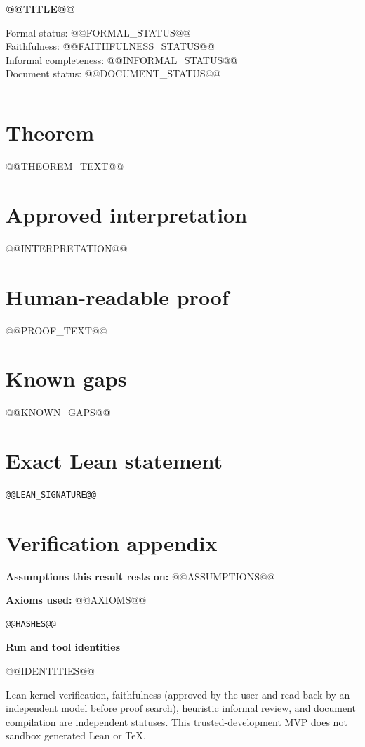 \documentclass[11pt]{article}
\begin{document}
\begin{center}
{\LARGE\color{HardyBlue}\bfseries @@TITLE@@\par}
\vspace{1em}
Formal status: @@FORMAL_STATUS@@\\
Faithfulness: @@FAITHFULNESS_STATUS@@\\
Informal completeness: @@INFORMAL_STATUS@@\\
Document status: @@DOCUMENT_STATUS@@
\end{center}

\hrule
\vspace{1em}

\section*{Theorem}
@@THEOREM_TEXT@@

\section*{Approved interpretation}
@@INTERPRETATION@@

\section*{Human-readable proof}
@@PROOF_TEXT@@

\section*{Known gaps}
@@KNOWN_GAPS@@

\section*{Exact Lean statement}
\begin{Verbatim}[fontsize=\small]
@@LEAN_SIGNATURE@@
\end{Verbatim}

\section*{Verification appendix}
\textbf{Assumptions this result rests on:} @@ASSUMPTIONS@@

\textbf{Axioms used:} @@AXIOMS@@

\begin{Verbatim}[fontsize=\small]
@@HASHES@@
\end{Verbatim}

\begin{samepage}
\textbf{Run and tool identities}
\begin{itemize}
@@IDENTITIES@@
\end{itemize}
\end{samepage}

\vfill
\small
Lean kernel verification, faithfulness (approved by the user and read back by an
independent model before proof search), heuristic informal review, and document
compilation are independent statuses. This trusted-development MVP
does not sandbox generated Lean or TeX.
\end{document}

